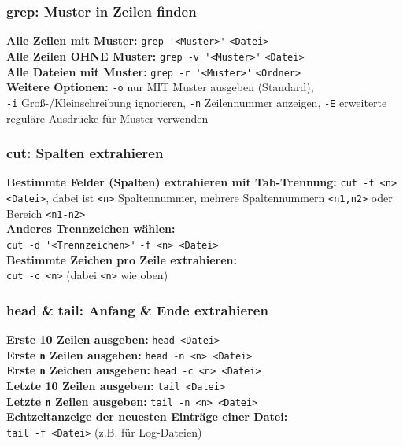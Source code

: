 \documentclass[a4paper, twocolumn]{scrarticle}
\begin{document}
\subsubsection{grep: Muster in Zeilen finden}
\textbf{Alle Zeilen mit Muster:} \lstinline|grep '<Muster>'| \lstinline|<Datei>|\\
\textbf{Alle Zeilen OHNE Muster:} \lstinline|grep -v '<Muster>'| \lstinline|<Datei>|\\
\textbf{Alle Dateien mit Muster:} \lstinline|grep -r '<Muster>'| \lstinline|<Ordner>|\\
\textbf{Weitere Optionen:} \lstinline|-o| nur MIT Muster ausgeben (Standard),\\ \lstinline|-i| Groß-/Kleinschreibung ignorieren, \lstinline|-n| Zeilennummer anzeigen, \lstinline|-E| erweiterte reguläre Ausdrücke für Muster verwenden
\subsubsection{cut: Spalten extrahieren}
\textbf{Bestimmte Felder (Spalten) extrahieren mit Tab-Trennung:} \lstinline|cut -f <n> <Datei>|, dabei ist \lstinline|<n>| Spaltennummer, mehrere Spaltennummern \lstinline|<n1,n2>| oder Bereich \lstinline|<n1-n2>|\\
\textbf{Anderes Trennzeichen wählen:}\\ \lstinline|cut -d '<Trennzeichen>'| \lstinline|-f <n> <Datei>|\\
\textbf{Bestimmte Zeichen pro Zeile extrahieren:}\\
\lstinline|cut -c <n>| (dabei \lstinline|<n>| wie oben)
\subsubsection{head \& tail: Anfang \& Ende extrahieren}
\textbf{Erste 10 Zeilen ausgeben:} \lstinline|head <Datei>|\\
\textbf{Erste \lstinline|n| Zeilen ausgeben:} \lstinline|head -n <n> <Datei>|\\
\textbf{Erste \lstinline|n| Zeichen ausgeben:} \lstinline|head -c <n> <Datei>|\\
\textbf{Letzte 10 Zeilen ausgeben:} \lstinline|tail <Datei>|\\
\textbf{Letzte \lstinline|n| Zeilen ausgeben:} \lstinline|tail -n <n> <Datei>|\\
\textbf{Echtzeitanzeige der neuesten Einträge einer Datei:} \\ \lstinline|tail -f <Datei>| (z.B. für Log-Dateien)
\end{document}
